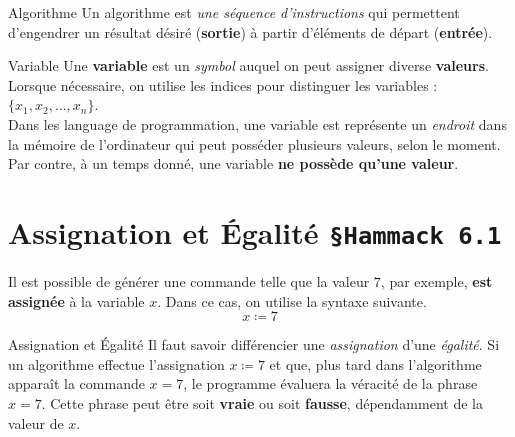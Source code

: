 \documentclass[16pt]{report}
\begin{document}
\begin{multicols*}{2}
                \begin{Definitionx}{Algorithme}{}
                    Un algorithme est \textit{une séquence d'instructions} 
                    qui permettent d'engendrer un résultat désiré (\textbf{sortie}) à partir d'éléments de départ 
                    (\textbf{entrée}). 
                \end{Definitionx}

                \begin{Definitionx}{Variable}{}
                    Une \textbf{variable} est un \textit{symbol} auquel on peut assigner diverse \textbf{valeurs}. 
                    Lorsque nécessaire, on utilise les indices pour distinguer les variables :
                    $\{x_1, x_2, \dots , x_n \}$.  
                    \vspace{1em}\\ 
                    Dans les language de programmation, une variable est représente un \textit{endroit}
                    dans la mémoire de l'ordinateur qui peut posséder plusieurs valeurs, selon le moment. 
                    Par contre, à un temps donné, une variable \textbf{ne possède qu'une valeur}. 
                \end{Definitionx}
                \columnbreak

                \section{Assignation et Égalité \texttt{\small{\S Hammack 6.1}}}
                \begin{EExample}{}{}
                    Il est possible de générer une commande telle que la valeur $7$, par exemple, \textbf{est assignée} 
                    à la variable $x$. Dans ce cas, on utilise la syntaxe suivante. 
                    \[ x \coloneqq 7\]
                \end{EExample}  

                \begin{Concept}{Assignation et Égalité}{}
                    Il faut savoir différencier une \textit{assignation} d'une \textit{égalité}. Si un algorithme 
                    effectue l'assignation $x \coloneqq 7$ et que, plus tard dans l'algorithme apparaît 
                    la commande $x = 7$, le programme évaluera la véracité de la phrase $x = 7$. 
                    Cette phrase peut être soit \textbf{vraie} ou soit \textbf{fausse}, dépendamment de 
                    la valeur de $x$. 
                \end{Concept}


\end{multicols*}
\end{document}
